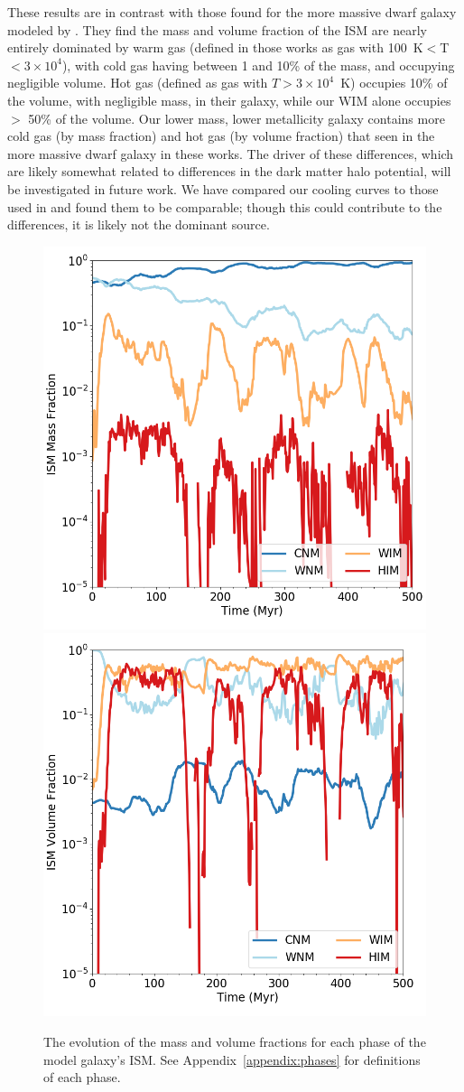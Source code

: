 These results are in contrast with those found for the more massive dwarf galaxy modeled by \citet{Hu2016,Hu2017}. They find the mass and volume fraction of the ISM are nearly entirely dominated by warm gas (defined in those works as gas with 100~K$<$T$< 3\times 10^{4}$), with cold gas having between 1 and 10\% of the mass, and occupying negligible volume. Hot gas (defined as gas with $T > 3\times 10^{4}$~K) occupies 10\% of the volume, with negligible mass, in their galaxy, while our WIM alone occupies $>$ 50\% of the volume. Our lower mass, lower metallicity galaxy contains more cold gas (by mass fraction) and hot gas (by volume fraction) that seen in the more massive dwarf galaxy in these works. The driver of these differences, which are likely somewhat related to differences in the dark matter halo potential, will be investigated in future work. We have compared our cooling curves to those used in \citep{Hu2017} and found them to be comparable; though this could contribute to the differences, it is likely not the dominant source.

\begin{figure}
\includegraphics[width=0.475\linewidth]{figures/ch1/phase_mass_fraction_evolution_log.png}
\includegraphics[width=0.475\linewidth]{figures/ch1/phase_volume_fraction_evolution_log.png}
\caption{The evolution of the mass and volume fractions for each phase of the model galaxy's ISM. See Appendix~\ref{appendix:phases} for definitions of each phase.}
\label{ch1:fig:ISM_evolution}
\end{figure}

